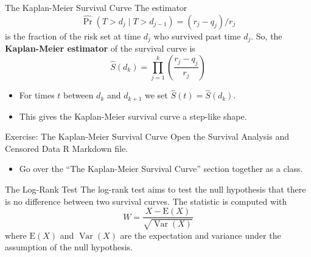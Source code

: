 \documentclass[
  ignorenonframetext,
  aspectratio=169,
]{beamer}
\providecommand{\tightlist}{%
  \setlength{\itemsep}{0pt}\setlength{\parskip}{0pt}}\usepackage{longtable,booktabs,array}
\begin{document}
\begin{frame}{The Kaplan-Meier Survival Curve}
\protect\hypertarget{the-kaplan-meier-survival-curve-2}{}
The estimator \[
\widehat{\operatorname{Pr}}\left(T>d_{j} \mid T>d_{j-1}\right)=\left(r_{j}-q_{j}\right) / r_{j}
\] is the fraction of the risk set at time \(d_j\) who survived past
time \(d_j\). So, the \textbf{Kaplan-Meier estimator} of the survival
curve is
\[\widehat{S}\left(d_{k}\right)=\prod_{j=1}^{k}\left(\frac{r_{j}-q_{j}}{r_{j}}\right)\]

\begin{itemize}
\item
  For times \(t\) between \(d_k\) and \(d_{k+1}\) we set
  \(\widehat{S}(t)=\widehat{S}\left(d_{k}\right)\).
\item
  This gives the Kaplan-Meier survival curve a step-like shape.
\end{itemize}
\end{frame}

\begin{frame}{Exercise: The Kaplan-Meier Survival Curve}
\protect\hypertarget{exercise-the-kaplan-meier-survival-curve}{}
Open the Survival Analysis and Censored Data R Markdown file.

\begin{itemize}
\tightlist
\item
  Go over the ``The Kaplan-Meier Survival Curve'' section together as a
  class.
\end{itemize}
\end{frame}

\begin{frame}{The Log-Rank Test}
\protect\hypertarget{the-log-rank-test}{}
The log-rank test aims to test the null hypothesis that there is no
difference between two survival curves. The statistic is computed with
\[W=\frac{X-\mathrm{E}(X)}{\sqrt{\operatorname{Var}(X)}}\] where
\(\mathrm{E}(X)\) and \(\operatorname{Var}(X)\) are the expectation and
variance under the assumption of the null hypothesis.
\end{frame}
\end{document}
